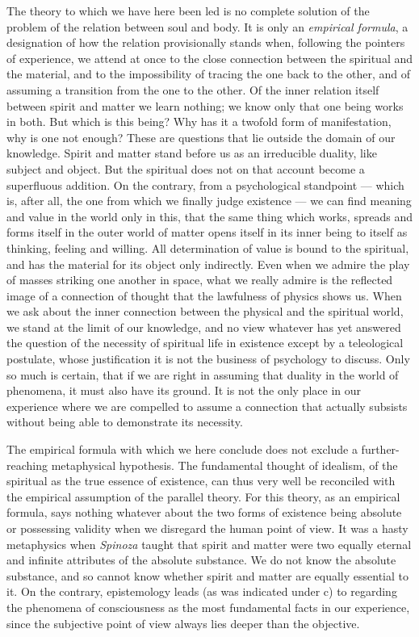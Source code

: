 \documentclass[12pt,a4paper]{book}
\newcommand{\opage}[1]{\marginnote{\footnotesize\textit{[#1]}}}
\begin{document}
The theory to which we have here been led is no complete solution of the
problem of the relation between soul and body. It is only an
\emph{empirical formula}, a designation of how the relation provisionally
stands when, following the pointers of experience, we attend at once to
the close connection between the spiritual and the material, and to the
impossibility of tracing the one back to the other, and of assuming a
transition from the one to the other. Of the inner relation itself
between spirit and matter we learn nothing; we know only that one being
works in both. But which is this being? Why has it a twofold form of
manifestation, why is one not enough? These are
\opage{80}questions that lie outside the domain of our knowledge. Spirit
and matter stand before us as an irreducible duality, like subject and
object. But the spiritual does not on that account become a superfluous
addition. On the contrary, from a psychological standpoint --- which is,
after all, the one from which we finally judge existence --- we can find
meaning and value in the world only in this, that the same thing which
works, spreads and forms itself in the outer world of matter opens
itself in its inner being to itself as thinking, feeling and willing.
All determination of value is bound to the spiritual, and has the
material for its object only indirectly. Even when we admire the play of
masses striking one another in space, what we really admire is the
reflected image of a connection of thought that the lawfulness of
physics shows us. When we ask about the inner connection between the
physical and the spiritual world, we stand at the limit of our
knowledge, and no view whatever has yet answered the question of the
necessity of spiritual life in existence except by a teleological
postulate, whose justification it is not the business of psychology to
discuss. Only so much is certain, that if we are right in assuming that
duality in the world of phenomena, it must also have its ground. It is
not the only place in our experience where we are compelled to assume a
connection that actually subsists without being able to demonstrate its
necessity.

The empirical formula with which we here conclude does not exclude a
further-reaching metaphysical hypothesis. The fundamental thought of
idealism, of the spiritual as the true essence of existence, can thus
very well be reconciled with the empirical assumption of the parallel
theory. For this theory, as an empirical formula, says nothing whatever
about the two forms of existence being absolute or possessing validity
when we disregard the human point of view. It was a hasty metaphysics
when \emph{Spinoza} taught that spirit and matter were two equally
eternal and infinite attributes of the absolute substance. We do not
know the absolute substance, and so cannot know whether spirit and
matter are equally essential to it. On the contrary, epistemology leads
(as was indicated under c) to regarding the phenomena of consciousness
as the most fundamental facts in our experience, since the subjective
point of view always lies deeper than the objective.
\end{document}
